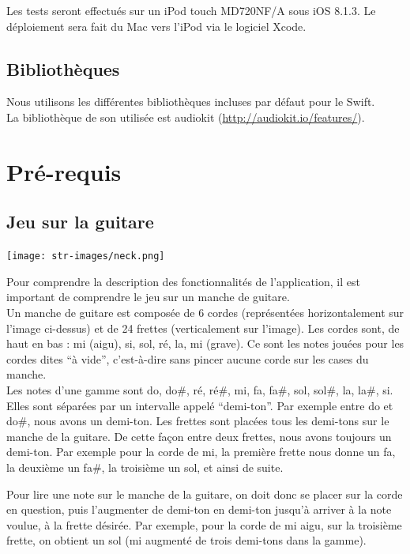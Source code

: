 \documentclass{scrreprt}
\begin{document}
Les tests seront effectués sur un iPod touch MD720NF/A sous iOS 8.1.3. Le déploiement sera fait du Mac vers l'iPod via le logiciel Xcode.

\subsection{Bibliothèques}

Nous utilisons les différentes bibliothèques incluses par défaut pour le Swift. \\
La bibliothèque de son utilisée est audiokit (\url{http://audiokit.io/features/}).


\section{Pré-requis}
\subsection{Jeu sur la guitare}

\bigbreak
\texttt{[image: str-images/neck.png]}
\bigbreak

Pour comprendre la description des fonctionnalités de l'application, il est important de comprendre le jeu sur un manche de guitare. \\
Un manche de guitare est composée de 6 cordes (représentées horizontalement sur l'image ci-dessus) et de 24 frettes (verticalement sur l'image).
Les cordes sont, de haut en bas : mi (aigu), si, sol, ré, la, mi (grave). Ce sont les notes jouées pour les cordes dites \enquote{à vide}, c'est-à-dire sans pincer aucune corde sur les cases du manche.\\

 Les notes d'une gamme sont do, do\#, ré, ré\#, mi, fa, fa\#, sol, sol\#, la, la\#, si. Elles sont séparées par un intervalle appelé \enquote{demi-ton}. Par exemple entre do et do\#, nous avons un demi-ton.
Les frettes sont placées tous les demi-tons sur le manche de la guitare. De cette façon entre deux frettes, nous avons toujours un demi-ton. Par exemple pour la corde de mi, la première frette nous donne un fa, la deuxième un fa\#, la troisième un sol, et ainsi de suite.

Pour lire une note sur le manche de la guitare, on doit donc se placer sur la corde en question, puis l'augmenter de demi-ton en demi-ton jusqu'à arriver à la note voulue, à la frette désirée. Par exemple, pour la corde de mi aigu, sur la troisième frette, on obtient un sol (mi augmenté de trois demi-tons dans la gamme).
\end{document}
